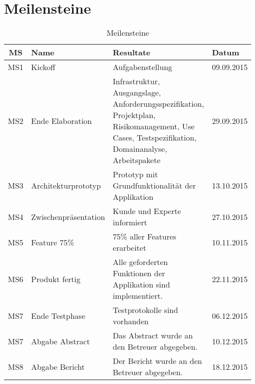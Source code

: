 
\section{Meilensteine}
\label{sec:Meilensteine}


\begin{table}[H]
\begin{tabularx}{\textwidth}{ c | l | X | l}
\textbf{MS} & \textbf{Name} & \textbf{Resultate}  & \textbf{Datum} \\ \hline
MS1 & Kickoff              & Aufgabenstellung & 09.09.2015 \\ \hline
MS2 & Ende Elaboration       & Infrastruktur, Ausgangslage, Anforderungsspezifikation, Projektplan, Risikomanagement, Use Cases, Testspezifikation, Domainanalyse, Arbeitspakete	& 29.09.2015 \\ \hline
MS3 & Architekturprototyp  & Prototyp mit Grundfunktionalität der Applikation	& 13.10.2015 \\ \hline
MS4 & Zwischenpräsentation & Kunde und Experte informiert & 27.10.2015 \\ \hline
MS5 & Feature 75\%         & 75\% aller Features erarbeitet & 10.11.2015 \\ \hline
MS6 & Produkt fertig       & Alle geforderten Funktionen der Applikation sind implementiert. & 22.11.2015 \\ \hline
MS7 & Ende Testphase       & Testprotokolle sind vorhanden & 06.12.2015 \\ \hline
MS7 & Abgabe Abstract      & Das Abstract wurde an den Betreuer abgegeben. & 10.12.2015 \\ \hline
MS8 & Abgabe Bericht       & Der Bericht wurde an den Betreuer abgegeben. & 18.12.2015 \\
\end{tabularx}
\caption{Meilensteine}
\end{table}

\pagebreak